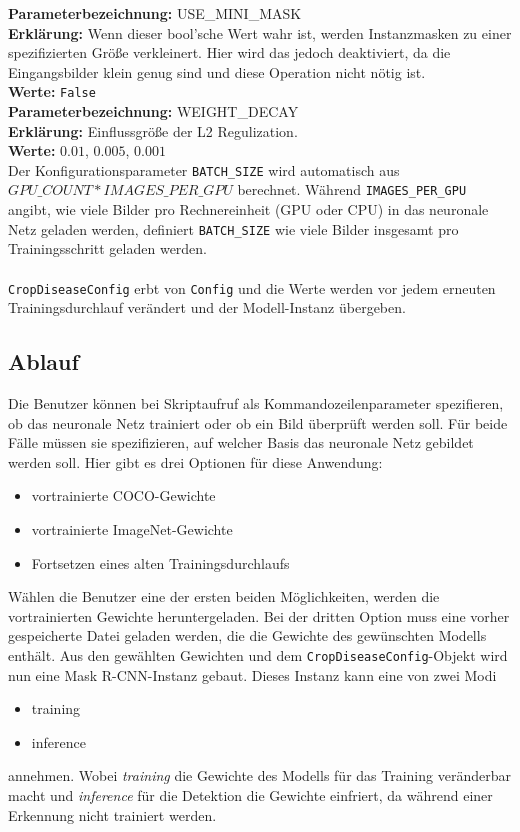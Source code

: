 \noindent
\textbf{Parameterbezeichnung:} USE\_MINI\_MASK\\
\textbf{Erklärung:} Wenn dieser bool'sche Wert wahr ist, werden Instanzmasken zu einer spezifizierten Größe verkleinert. Hier wird das jedoch deaktiviert, da die Eingangsbilder klein genug sind und diese Operation nicht nötig ist.\\
\textbf{Werte:} \texttt{False}\\

\noindent
\textbf{Parameterbezeichnung:} WEIGHT\_DECAY\\
\textbf{Erklärung:} Einflussgröße der L2 Regulization.\\
\textbf{Werte:} $0.01$, $0.005$, $0.001$\\

\noindent
Der Konfigurationsparameter \texttt{BATCH\_SIZE} wird automatisch aus $GPU\_COUNT * IMAGES\_PER\_GPU$ berechnet. Während \texttt{IMAGES\_PER\_GPU} angibt, wie viele Bilder pro Rechnereinheit (GPU oder CPU) in das neuronale Netz geladen werden, definiert \texttt{BATCH\_SIZE} wie viele Bilder insgesamt pro Trainingsschritt geladen werden.
\\\\
\texttt{CropDiseaseConfig} erbt von \texttt{Config} und die Werte werden vor jedem erneuten Trainingsdurchlauf verändert und der Modell-Instanz übergeben.  

\subsection{Ablauf}

Die Benutzer können bei Skriptaufruf als Kommandozeilenparameter spezifieren, ob das neuronale Netz trainiert oder ob ein Bild überprüft werden soll. Für beide Fälle müssen sie spezifizieren, auf welcher Basis das neuronale Netz gebildet werden soll. Hier gibt es drei Optionen für diese Anwendung:

\begin{itemize}
	\item vortrainierte COCO-Gewichte
	\item vortrainierte ImageNet-Gewichte
	\item Fortsetzen eines alten Trainingsdurchlaufs
\end{itemize}
\noindent
Wählen die Benutzer eine der ersten beiden Möglichkeiten, werden die vortrainierten Gewichte heruntergeladen. Bei der dritten Option muss eine vorher gespeicherte Datei geladen werden, die die Gewichte des gewünschten Modells enthält. Aus den gewählten Gewichten und dem \texttt{CropDiseaseConfig}-Objekt wird nun eine Mask R-CNN-Instanz gebaut. Dieses Instanz kann eine von zwei Modi 
\begin{itemize}
	\item training
	\item inference
\end{itemize}
annehmen. Wobei \textit{training} die Gewichte des Modells für das Training veränderbar macht und \textit{inference} für die Detektion die Gewichte einfriert, da während einer Erkennung nicht trainiert werden.

